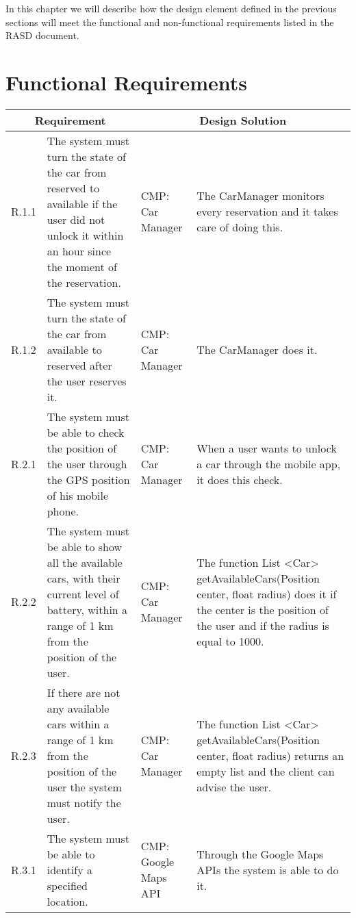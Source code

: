 In this chapter we will describe how the design element defined in the previous sections will meet the functional and non-functional requirements listed in the RASD document.

\section{Functional Requirements}

\begin{center}
\begin{longtable}{|p{}|p{}|>{\raggedright\arraybackslash}p{}|>{\raggedright\arraybackslash}p{}|}
\hline
\multicolumn{2}{|c|}{\textbf{Requirement}} & \multicolumn{2}{c|}{\textbf{Design Solution}} \\ \hline
R.1.1 & The system must turn the state of the car from reserved to available if the user did not unlock it within an hour since the moment of the reservation. & CMP: \linebreak Car Manager & The CarManager monitors every reservation and it takes care of doing this.  \\ \hline
R.1.2 & The system must turn the state of the car from available to reserved after the user reserves it. & CMP: Car Manager & The CarManager does it. \\ \hline
R.2.1 & The system must be able to check the position of the user through the GPS position of his mobile phone. & CMP: Car Manager & When a user wants to unlock a car through the mobile app, it does this check. \\ \hline
R.2.2 & The system must be able to show all the available cars, with their current level of battery, within a range of 1 km from the position of the user. & CMP: Car Manager & The function List \textless Car\textgreater{} getAvailableCars(Position center, float radius) does it if the center is the position of the user and if the radius is equal to 1000. \\ \hline
R.2.3 & If there are not any available cars within a range of 1 km from the position of the user the system must notify the user. & CMP: Car Manager & The function List \textless Car\textgreater{} getAvailableCars(Position center, float radius) returns an empty list and the client can advise the user. \\ \hline
R.3.1 & The system must be able to identify a specified location. & CMP: Google Maps API & Through the Google Maps APIs the system is able to do it. \\ \hline

\end{longtable}
\end{center}
